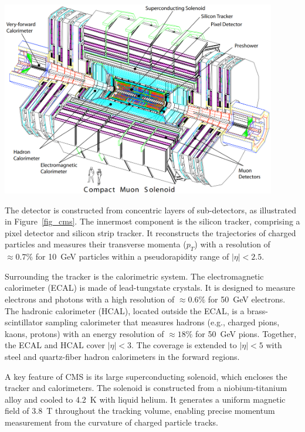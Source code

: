 \begin{center}
	\includegraphics[width=0.9\textwidth]{Images/CMS.png}
	\label{fig_cms}
\end{center}

The detector is constructed from concentric layers of sub-detectors, as illustrated in Figure~\ref{fig_cms}. The innermost component is the silicon tracker, comprising a pixel detector and silicon strip tracker. It reconstructs the trajectories of charged particles and measures their transverse momenta ($p_T$) with a resolution of $\approx 0.7\%$ for 10~GeV particles within a pseudorapidity range of $|\eta| < 2.5$.



Surrounding the tracker is the calorimetric system. The electromagnetic calorimeter (ECAL) is made of lead-tungstate crystals. It is designed to measure electrons and photons with a high resolution of $\approx 0.6\%$ for 50~GeV electrons. The hadronic calorimeter (HCAL), located outside the ECAL, is a brass-scintillator sampling calorimeter that measures hadrons (e.g., charged pions, kaons, protons) with an energy resolution of $\approx 18\%$ for 50~GeV pions. Together, the ECAL and HCAL cover $|\eta| < 3$. The coverage is extended to $|\eta| < 5$ with steel and quartz-fiber hadron calorimeters in the forward regions.

A key feature of CMS is its large superconducting solenoid, which encloses the tracker and calorimeters. The solenoid is constructed from a niobium-titanium alloy and cooled to 4.2~K with liquid helium. It generates a uniform magnetic field of 3.8~T throughout the tracking volume, enabling precise momentum measurement from the curvature of charged particle tracks.

